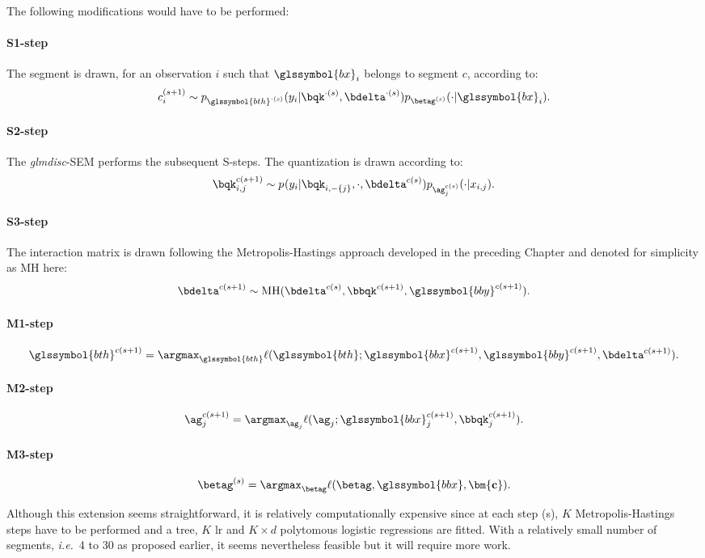 The following modifications would have to be performed:
\paragraph{S1-step} The segment is drawn, for an observation $i$ such that $\glssymbol{bx}_i$ belongs to segment $c$, according to:
\[ c_i^{(s+1)} \sim p_{\glssymbol{bth}^{\cdot(s)}}(y_i | \bqk^{\cdot(s)},\bdelta^{\cdot(s)}) p_{\betag^{(s)}}(\cdot | \glssymbol{bx}_i). \]
\paragraph{S2-step} The \textit{glmdisc}-SEM performs the subsequent S-steps. The quantization is drawn according to:
\[ \bqk_{i,j}^{c(s+1)} \sim p_{}(y_i | \bqk_{i,-\{j\}}, \cdot, \bdelta^{c(s)}) p_{\ag_j^{c(s)}}(\cdot | x_{i,j}). \]
\paragraph{S3-step} The interaction matrix is drawn following the Metropolis-Hastings approach developed in the preceding Chapter and denoted for simplicity as MH here:
\[ \bdelta^{c(s+1)} \sim \text{MH}(\bdelta^{c(s)}, \bbqk^{c(s+1)}, \glssymbol{bby}^{c(s+1)}). \]
\paragraph{M1-step}
\[ \glssymbol{bth}^{c(s+1)} = \argmax_{\glssymbol{bth}} \ell(\glssymbol{bth};\glssymbol{bbx}^{c(s+1)},\glssymbol{bby}^{c(s+1)}, \bdelta^{c(s+1)}). \]
\paragraph{M2-step}
\[ \ag_j^{c(s+1)} = \argmax_{\ag_j} \ell(\ag_j;\glssymbol{bbx}_j^{c(s+1)},\bbqk_j^{c(s+1)}). \]
\paragraph{M3-step}
\[ \betag^{(s)} = \argmax_{\betag} \ell(\betag, \glssymbol{bbx}, \mathbf{\bm{c}}). \]

Although this extension seems straightforward, it is relatively computationally expensive since at each step (s), $K$ Metropolis-Hastings steps have to be performed and a tree, $K$ \gls{lr} and $K \times d$ polytomous logistic regressions are fitted. With a relatively small number of segments, \textit{i.e.}\ 4 to 30 as proposed earlier, it seems nevertheless feasible but it will require more work.

